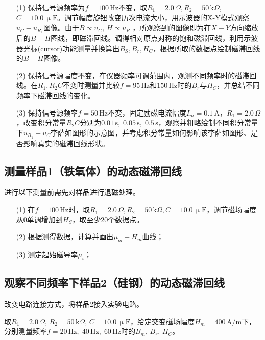 \documentclass[12pt]{article}
\begin{document}
\begin{enumerate}
    \item[(1)] 保持信号源频率为$ f=100\,\mathrm{Hz} $不变，取$ R_1=2.0\,\Omega $,\,$ R_2=50\,\mathrm k\Omega $,\,$ C=10.0\,\upmu\mathrm F $。调节幅度旋钮改变历次电流大小，用示波器的X-Y模式观察$ u_C-u_{R_1} $图像。由于$ B\propto u_C,\,H\propto u_{R_1} $，所观察到的图像即为在$X-Y$方向缩放后的$B-H$图线，即磁滞回线。调得相对原点对称的饱和磁滞回线，利用示波器光标(cursor)功能测量并换算出$ B_S,B_r,H_C $，根据所取的数据点绘制磁滞回线的$ B-H $图像。
    \item[(2)] 保持信号源幅度不变，在仪器频率可调范围内，观测不同频率时的磁滞回线。在$ R_1,R_2C $不变时测量并比较$ f=95\,\mathrm{Hz} $和$ 150\,\mathrm{Hz} $时的$ B_r $与$ H_C $，并总结不同频率下磁滞回线的变化。
    \item[(3)] 保持信号源频率$ f=50\,\mathrm{Hz} $不变，固定励磁电流幅度$ I_m=0.1\,\mathrm A $，$ R_1=2.0\,\Omega $，改变积分常量$ R_2C $分别为$ 0.01\,\mathrm s,\;0.05\,\mathrm s,\;0.5\,\mathrm s $，观察并粗略绘制不同积分常量下$ u_{R_1}-u_C $李萨如图形的示意图，并考虑积分常量如何影响该李萨如图形、是否影响真实的磁滞回线形状。
\end{enumerate}

\subsection{测量样品1（铁氧体）的动态磁滞回线}
进行以下测量前需先对样品进行退磁处理。

\begin{enumerate}
    \item[(1)] 在$ f=100\,\mathrm{Hz} $时，取$ R_1=2.0\,\Omega $,\,$ R_2=50\,\mathrm k\Omega $,\,$ C=10.0\,\upmu\mathrm F $，调节磁场幅度从$ 0 $单调增加到$ H_S $，取至少20个数据点。
    \item[(2)] 根据测得数据，计算并画出$ \mu_m-H_m $曲线；
    \item[(3)] 测定起始磁导率$ \mu_i $；
\end{enumerate}

\subsection{观察不同频率下样品2（硅钢）的动态磁滞回线}
改变电路连接方式，将样品2接入实验电路。

取$ R_1=2.0\,\Omega ,\, R_2=50\,\mathrm k\Omega ,\, C=10.0\,\upmu\mathrm F $，给定交变磁场幅度$ H_m=400\,\mathrm{A/m} $下，分别测量频率$ f=20\,\mathrm{Hz},\;40\,\mathrm{Hz},\;60\,\mathrm{Hz} $时的$ B_m,\,B_r,\,H_C $。
\end{document}
